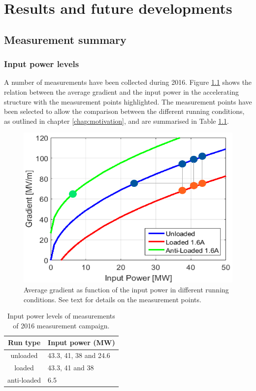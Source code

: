 \chapter[Results and future developments]{Results and future developments}
\label{chap:results}

\section[Measurement  summary]{Measurement summary}

\subsection[Input power levels]{Input power levels}

A number of measurements have been collected during 2016. Figure \ref{g_IP} shows the relation between the average gradient and the input power in the accelerating structure with the measurement points highlighted. The measurement points have been selected to allow the comparison between the different running conditions, as outlined in chapter \ref{chap:motivation}, and are summarised in Table \ref{run_pwr}.

\begin{figure}[h]
\centering 
\includegraphics[scale=0.7]{pictures/grad_vs_inPow.png}
\caption{Average gradient as function of the input power in different running conditions. See text for details on the measurement points. }
\label{g_IP}
\end{figure}



\begin{table}
  \centering
    \begin{tabular}{ c l }
    \hline
    \hline
    Run type		&	Input power (MW)		\\
    \hline
    unloaded 		&	43.3, 41, 38 and 24.6	\\
    loaded			&	43.3, 41 and 38			\\
    anti-loaded		&	6.5					\\
    \hline
    \hline
    \end{tabular}
\caption{Input power levels of measurements of 2016 measurement campaign.}
\label{run_pwr}
\end{table}

